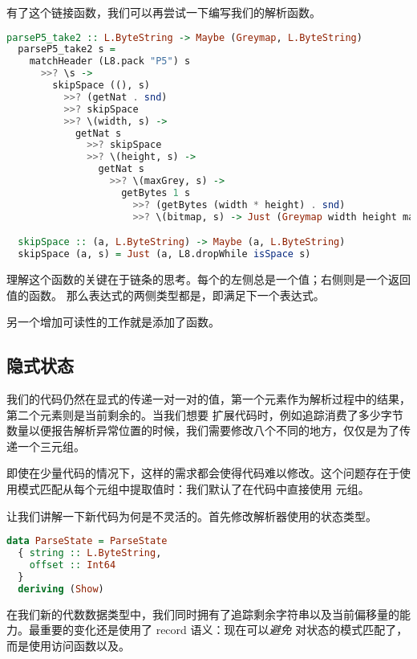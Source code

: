 \documentclass[./main.tex]{subfiles}
\begin{document}
有了这个链接函数，我们可以再尝试一下编写我们的解析函数。

\begin{lstlisting}[language=Haskell]
  parseP5_take2 :: L.ByteString -> Maybe (Greymap, L.ByteString)
  parseP5_take2 s =
    matchHeader (L8.pack "P5") s
      >>? \s ->
        skipSpace ((), s)
          >>? (getNat . snd)
          >>? skipSpace
          >>? \(width, s) ->
            getNat s
              >>? skipSpace
              >>? \(height, s) ->
                getNat s
                  >>? \(maxGrey, s) ->
                    getBytes 1 s
                      >>? (getBytes (width * height) . snd)
                      >>? \(bitmap, s) -> Just (Greymap width height maxGrey bitmap, s)

  skipSpace :: (a, L.ByteString) -> Maybe (a, L.ByteString)
  skipSpace (a, s) = Just (a, L8.dropWhile isSpace s)
\end{lstlisting}

理解这个函数的关键在于链条的思考。每个的左侧总是一个值；右侧则是一个返回值的函数。
那么表达式的两侧类型都是，即满足下一个表达式。

另一个增加可读性的工作就是添加了函数。

\subsection*{隐式状态}

我们的代码仍然在显式的传递一对一对的值，第一个元素作为解析过程中的结果，第二个元素则是当前剩余的。当我们想要
扩展代码时，例如追踪消费了多少字节数量以便报告解析异常位置的时候，我们需要修改八个不同的地方，仅仅是为了传递一个三元组。

即使在少量代码的情况下，这样的需求都会使得代码难以修改。这个问题存在于使用模式匹配从每个元组中提取值时：我们默认了在代码中直接使用
元组。

让我们讲解一下新代码为何是不灵活的。首先修改解析器使用的状态类型。

\begin{lstlisting}[language=Haskell]
  data ParseState = ParseState
  { string :: L.ByteString,
    offset :: Int64
  }
  deriving (Show)
\end{lstlisting}

在我们新的代数数据类型中，我们同时拥有了追踪剩余字符串以及当前偏移量的能力。最重要的变化还是使用了 record 语义：现在可以\textit{避免}
对状态的模式匹配了，而是使用访问函数以及。
\end{document}
